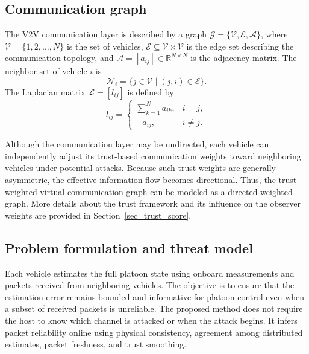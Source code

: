 \documentclass[letterpaper,journal]{IEEEtran}
\def\V{\mathcal{V}} %
\def\E{\mathcal{E}} %
\def\G{\mathcal{G}} %
\def\A{\mathcal{A}} %
\def\L{\mathcal{L}} %
\def\N{\mathcal{N}} %
\begin{document}

\subsection{Communication graph}
The V2V communication layer is described by a graph $\G=\{\V,\E,\A\}$, where $\V=\{1,2,\ldots,N\}$ is the set of vehicles, $\E\subseteq\V\times\V$ is the edge set describing the communication topology, and $\A=[a_{ij}]\in\mathbb{R}^{N\times N}$ is the adjacency matrix. The neighbor set of vehicle $i$ is
\begin{equation}
    \N_i=\{j\in\V\mid (j,i)\in\E\}.
\end{equation}
The Laplacian matrix $\L=[l_{ij}]$ is defined by
\begin{equation}
    l_{ij}=\begin{cases}
        \sum_{k=1}^{N}a_{ik}, & i=j,\\
        -a_{ij}, & i\neq j.
    \end{cases}
\end{equation}

Although the communication layer may be undirected, each vehicle can independently adjust its trust-based communication weights toward neighboring vehicles under potential attacks. Because such trust weights are generally asymmetric, the effective information flow becomes directional. Thus, the trust-weighted virtual communication graph can be modeled as a directed weighted graph. More details about the trust framework and its influence on the observer weights are provided in Section~\ref{sec_trust_score}. 

\subsection{Problem formulation and threat model}\label{subsec_threat_model}

Each vehicle estimates the full platoon state using onboard measurements and packets received from neighboring vehicles. The objective is to ensure that the estimation error remains bounded and informative for platoon control even when a subset of received packets is unreliable.
The proposed method does not require the host to know which channel is attacked or when the attack begins. It infers packet reliability online using physical consistency, agreement among distributed estimates, packet freshness, and trust smoothing.
\end{document}
